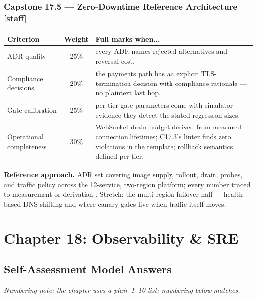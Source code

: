 \subsubsection*{Capstone 17.5 --- Zero-Downtime Reference Architecture [staff]}
\begin{center}\small
\begin{tabularx}{\textwidth}{l c X}
\toprule
\textbf{Criterion} & \textbf{Weight} & \textbf{Full marks when\ldots} \\
\midrule
ADR quality & 25\% & every ADR names rejected alternatives and reversal cost. \\
Compliance decisions & 20\% & the payments path has an explicit TLS-termination decision with compliance rationale --- no plaintext last hop. \\
Gate calibration & 25\% & per-tier gate parameters come with simulator evidence they detect the stated regression sizes. \\
Operational completeness & 30\% & WebSocket drain budget derived from measured connection lifetimes; C17.3's linter finds zero violations in the template; rollback semantics defined per tier. \\
\bottomrule
\end{tabularx}
\end{center}
\textbf{Reference approach.} ADR set covering image supply, rollout,
drain, probes, and traffic policy across the 12-service, two-region
platform; every number traced to measurement or derivation
\cite{twelvefactor, beyer2016sre}. Stretch: the multi-region failover
half --- health-based DNS shifting and where canary gates live when
traffic itself moves.

\section{Chapter 18: Observability \& SRE}
\label{sec:sol-ch18}

\subsection{Self-Assessment Model Answers}

\emph{Numbering note: the chapter uses a plain 1--10 list; numbering below
matches.}

